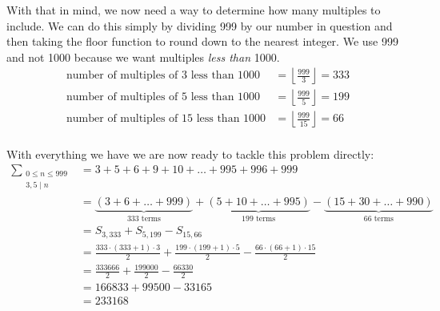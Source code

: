 \documentclass{article}
\begin{document}
With that in mind, we now need a way to determine how many multiples to
include. We can do this simply by dividing 999 by our number in question and
then taking the floor function to round down to the nearest integer. We use 999
and not 1000 because we want multiples \emph{less than} 1000.
\[ \begin{aligned}
    \text{number of multiples of 3 less than 1000}
        &= \left \lfloor \frac{999}{3} \right \rfloor = 333 \\
    \text{number of multiples of 5 less than 1000}
        &= \left \lfloor \frac{999}{5} \right \rfloor = 199 \\
    \text{number of multiples of 15 less than 1000}
        &= \left \lfloor \frac{999}{15} \right \rfloor = 66 \\
\end{aligned} \]

With everything we have we are now ready to tackle this problem directly:
\[ \begin{aligned}
    \sum_{\substack{0 \leq n \leq 999\\3,5\mid n}}
    &= 3 + 5 + 6 + 9 + 10 + \dots + 995 + 996 + 999 \\
    &= \underbrace{(3 + 6 + \dots + 999)}_{\text{333 terms}}
     + \underbrace{(5 + 10 + \dots + 995)}_{\text{199 terms}}
     - \underbrace{(15 + 30 + \dots + 990)}_{\text{66 terms}} \\
    &= S_{3,333} + S_{5,199} - S_{15,66} \\
    &= \frac{333 \cdot (333+1) \cdot 3}{2}
        + \frac{199 \cdot (199+1) \cdot 5}{2}
        - \frac{66 \cdot (66+1) \cdot 15}{2} \\
    &= \frac{333666}{2} + \frac{199000}{2} - \frac{66330}{2} \\
    &= 166833 + 99500 - 33165 \\
    &= 233168
\end{aligned} \]
\end{document}
